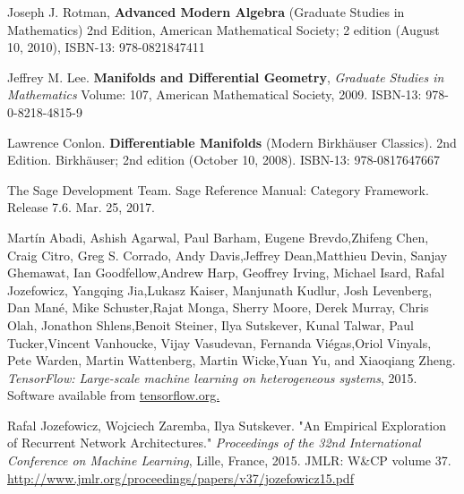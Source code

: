 \documentclass[10pt]{amsart}
\begin{document}
\begin{thebibliography}{9}
Joseph J. Rotman, \textbf{Advanced Modern Algebra} (Graduate Studies in Mathematics) 2nd Edition, American Mathematical Society; 2 edition (August 10, 2010), ISBN-13: 978-0821847411

Jeffrey M. Lee. \textbf{Manifolds and Differential Geometry}, \emph{Graduate Studies in Mathematics} Volume: 107, American Mathematical Society, 2009. ISBN-13: 978-0-8218-4815-9

Lawrence Conlon.  \textbf{Differentiable Manifolds} (Modern Birkhäuser Classics).  2nd Edition.  Birkhäuser; 2nd edition (October 10, 2008).  ISBN-13: 978-0817647667

The Sage Development Team.  Sage Reference Manual: Category Framework.  Release 7.6.  Mar. 25, 2017.  

Martín Abadi, Ashish Agarwal, Paul Barham, Eugene Brevdo,Zhifeng Chen, Craig Citro, Greg S. Corrado, Andy Davis,Jeffrey Dean,Matthieu Devin, Sanjay Ghemawat, Ian Goodfellow,Andrew Harp, Geoffrey Irving, Michael Isard, Rafal Jozefowicz, Yangqing Jia,Lukasz Kaiser, Manjunath Kudlur, Josh Levenberg, Dan Mané, Mike Schuster,Rajat Monga, Sherry Moore, Derek Murray, Chris Olah, Jonathon Shlens,Benoit Steiner, Ilya Sutskever, Kunal Talwar, Paul Tucker,Vincent Vanhoucke, Vijay Vasudevan, Fernanda Viégas,Oriol Vinyals, Pete Warden, Martin Wattenberg, Martin Wicke,Yuan Yu, and Xiaoqiang Zheng.  
\emph{TensorFlow: Large-scale machine learning on heterogeneous systems}, 2015. Software available from \href{http://tensorflow.org/}{tensorflow.org.}

Rafal Jozefowicz, Wojciech Zaremba, Ilya Sutskever.  "An Empirical Exploration of Recurrent Network Architectures."  \emph{Proceedings of the 32nd
International  Conference on  Machine Learning}, Lille, France, 2015.  JMLR: W\&CP volume 37.  \url{http://www.jmlr.org/proceedings/papers/v37/jozefowicz15.pdf} 


  
\end{thebibliography}
\end{document}
